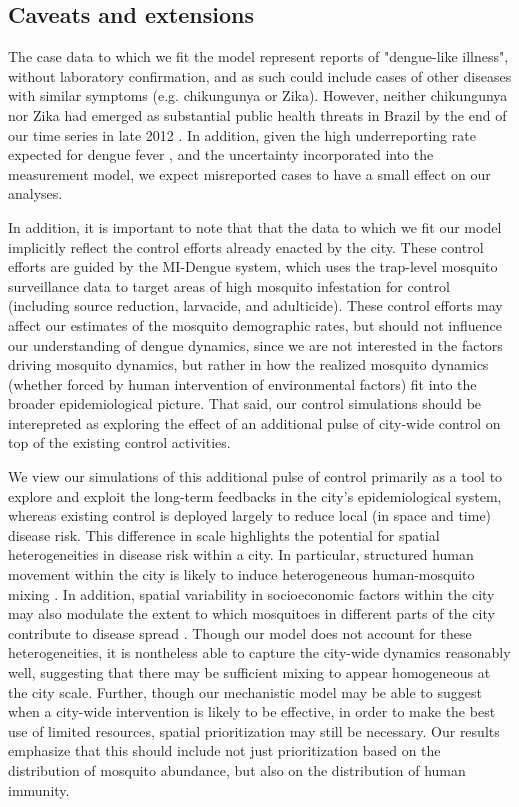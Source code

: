\documentclass[10pt,letterpaper]{article}
\begin{document}
\subsection*{Caveats and extensions}

The case data to which we fit the model represent reports of "dengue-like illness", without laboratory confirmation, and as such could include cases of other diseases with similar symptoms (e.g. chikungunya or Zika).
However, neither chikungunya nor Zika had emerged as substantial public health threats in Brazil by the end of our time series in late 2012 \cite{PAHO2014, PAHO2015}.
In addition, given the high underreporting rate expected for dengue fever \cite{Silva2016}, and the uncertainty incorporated into the measurement model, we expect misreported cases to have a small effect on our analyses.

In addition, it is important to note that that the data to which we fit our model implicitly reflect the control efforts already enacted by the city.
These control efforts are guided by the MI-Dengue system, which uses the trap-level mosquito surveillance data to target areas of high mosquito infestation for control (including source reduction, larvacide, and adulticide)\cite{Eiras2009}.
These control efforts may affect our estimates of the mosquito demographic rates, but should not influence our understanding of dengue dynamics, since we are not interested in the factors driving mosquito dynamics, but rather in how the realized mosquito dynamics (whether forced by human intervention of environmental factors) fit into the broader epidemiological picture.
That said, our control simulations should be interepreted as exploring the effect of an additional pulse of city-wide control on top of the existing control activities.

We view our simulations of this additional pulse of control primarily as a tool to explore and exploit the long-term feedbacks in the city's epidemiological system, whereas existing control is deployed largely to reduce local (in space and time) disease risk.
This difference in scale highlights the potential for spatial heterogeneities in disease risk within a city.
In particular, structured human movement within the city is likely to induce heterogeneous human-mosquito mixing \cite{Adams2009, Cosner2009a, Stoddard2009}.
In addition, spatial variability in socioeconomic factors within the city may also modulate the extent to which mosquitoes in different parts of the city contribute to disease spread \cite{Mondini2008, Honorio2009, Hu2012, DeMattosAlmeida2007}.
Though our model does not account for these heterogeneities, it is nontheless able to capture the city-wide dynamics reasonably well, suggesting that there may be sufficient mixing to appear homogeneous at the city scale.
Further, though our mechanistic model may be able to suggest when a city-wide intervention is likely to be effective, in order to make the best use of limited resources, spatial prioritization may still be necessary.
Our results emphasize that this should include not just prioritization based on the distribution of mosquito abundance, but also on the distribution of human immunity.
\end{document}
